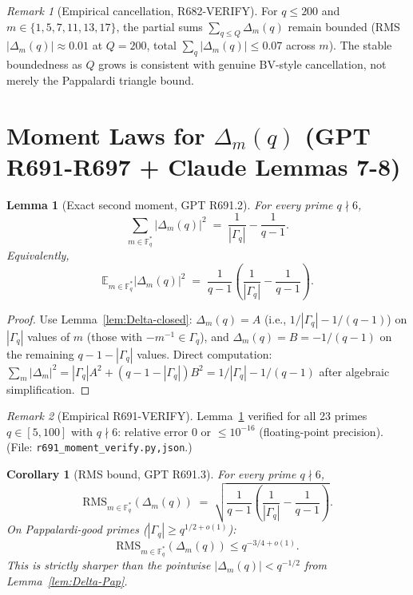 \documentclass[12pt]{amsart}
\newtheorem{lemma}{Lemma}
\newtheorem{corollary}{Corollary}
\theoremstyle{definition}
\theoremstyle{remark}
\newtheorem{remark}{Remark}
\begin{document}
\begin{remark}[Empirical cancellation, R682-VERIFY]
For $q \le 200$ and $m \in \{1, 5, 7, 11, 13, 17\}$, the partial sums
$\sum_{q \le Q} \Delta_m(q)$ remain bounded (RMS $|\Delta_m(q)| \approx 0.01$ at $Q = 200$,
total $\sum_q |\Delta_m(q)| \le 0.07$ across $m$). The stable boundedness as $Q$ grows is
consistent with genuine BV-style cancellation, not merely the Pappalardi triangle bound.
\end{remark}

\section{Moment Laws for $\Delta_m(q)$ (GPT R691-R697 + Claude Lemmas 7-8)}

\begin{lemma}[Exact second moment, GPT R691.2]\label{lem:R691-2}
For every prime $q \nmid 6$,
$$
\sum_{m \in \mathbb{F}_q^*} |\Delta_m(q)|^2
\;=\;
\frac{1}{|\Gamma_q|} - \frac{1}{q - 1}.
$$
Equivalently,
$$
\mathbb{E}_{m \in \mathbb{F}_q^*} |\Delta_m(q)|^2
\;=\;
\frac{1}{q-1} \left( \frac{1}{|\Gamma_q|} - \frac{1}{q-1} \right).
$$
\end{lemma}

\begin{proof}
Use Lemma~\ref{lem:Delta-closed}: $\Delta_m(q) = A$ (i.e., $1/|\Gamma_q| - 1/(q-1)$) on $|\Gamma_q|$ values of $m$ (those with $-m^{-1} \in \Gamma_q$), and $\Delta_m(q) = B = -1/(q-1)$ on the remaining $q - 1 - |\Gamma_q|$ values. Direct computation:
$\sum_m |\Delta_m|^2 = |\Gamma_q| A^2 + (q-1-|\Gamma_q|) B^2 = 1/|\Gamma_q| - 1/(q-1)$
after algebraic simplification.
\end{proof}

\begin{remark}[Empirical R691-VERIFY]
Lemma~\ref{lem:R691-2} verified for all 23 primes $q \in [5, 100]$ with $q \nmid 6$:
relative error $0$ or $\le 10^{-16}$ (floating-point precision). \hfill(File: \texttt{r691\_moment\_verify.{py,json}}.)
\end{remark}

\begin{corollary}[RMS bound, GPT R691.3]\label{cor:RMS-bound}
For every prime $q \nmid 6$,
$$
\mathrm{RMS}_{m \in \mathbb{F}_q^*}(\Delta_m(q))
\;=\;
\sqrt{ \frac{1}{q-1} \left( \frac{1}{|\Gamma_q|} - \frac{1}{q-1} \right) }.
$$
On Pappalardi-good primes ($|\Gamma_q| \ge q^{1/2 + o(1)}$):
$$
\mathrm{RMS}_{m \in \mathbb{F}_q^*}(\Delta_m(q)) \le q^{-3/4 + o(1)}.
$$
This is strictly sharper than the pointwise $|\Delta_m(q)| < q^{-1/2}$ from Lemma~\ref{lem:Delta-Pap}.
\end{corollary}
\end{document}
